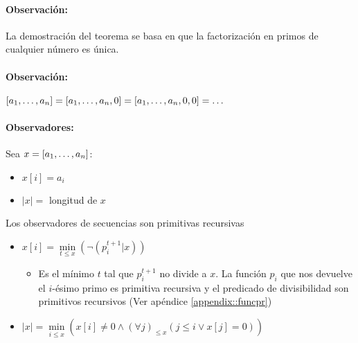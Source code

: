 \paragraph{Observación:} La demostración del teorema se basa en que la factorización en primos de cualquier número es única.

\paragraph{Observación:} $[a_1,\dots, a_{n}] = [a_1,\dots, a_{n},0] = [a_1,\dots, a_{n},0,0]= \dots$

\paragraph{Observadores:} Sea $x=[a_1,\dots, a_{n}]$:
\begin{itemize}
	\item $x[i] = a_i$
	\item $|x| =$ longitud de $x$
\end{itemize}

\begin{proposicion}\label{proposicion::observadoresSecuenciaSonPR}
Los observadores de secuencias son primitivas recursivas
\end{proposicion}

\begin{demo}
	\begin{itemize}
		\item $x[i] = \min\limits_{t\leq x}\left(\lnot\left(p_i^{t+1}|x\right)\right)$
			\begin{itemize}
				\item [] Es el mínimo $t$ tal que $p_i^{t+1}$ no divide a $x$. La función $p_i$ que nos devuelve el $i$-ésimo primo es primitiva recursiva y el predicado de divisibilidad son primitivos recursivos (Ver apéndice \ref{appendix::funcpr})
			\end{itemize}
		\item $|x| = \min\limits_{i\leq x}\left(x[i]\neq 0 \land \left(\forall j\right)_{\leq x} \left(j\leq i \lor x[j] = 0\right)\right)$
	\end{itemize}
\end{demo}
